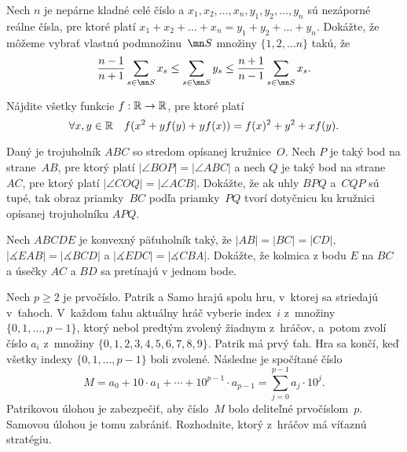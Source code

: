 {%
Nech $n$ je nepárne kladné celé číslo a $x_1, x_2, \dots, x_n, y_1, y_2, \dots, y_n$
sú nezáporné reálne čísla, pre ktoré platí
$x_1 + x_2 + \dots + x_n = y_1 + y_2 + \dots + y_n$.
Dokážte, že môžeme vybrať vlastnú podmnožinu~$\mn S$ množiny $\{1,2,\dots n\}$ takú, že
$$\frac{n-1}{n+1}\sum_{s\in\mn S}x_s \leq \sum_{s\in\mn S}y_s \leq \frac{n+1}{n-1}\sum_{s\in\mn S}x_s.$$}

{%
Nájdite všetky funkcie $f:\Bbb{R} \to \Bbb{R} $, pre ktoré platí
$$\forall x,y\in \Bbb{R}\quad f(x^2+yf(y)+yf(x))=f(x)^2+y^2+xf(y).$$}

{%
Daný je trojuholník $ABC$ so stredom opísanej kružnice~$O$.
Nech $P$ je taký bod na strane~$AB$, pre ktorý platí $|\angle BOP| = |\angle ABC|$
a nech $Q$ je taký bod na strane~$AC$, pre ktorý platí $|\angle COQ| = |\angle ACB|$.
Dokážte, že ak uhly $BPQ$ a~$CQP$ sú tupé,
tak obraz priamky~$BC$ podľa priamky~$PQ$ tvorí dotyčnicu ku kružnici
opísanej trojuholníku $APQ$.}

{%
Nech $ABCDE$ je konvexný päťuholník taký, že $|AB|=|BC|=|CD|$, $|\measuredangle EAB| = |\measuredangle BCD|$ a $|\measuredangle EDC| = |\measuredangle CBA|$. Dokážte, že kolmica z bodu $E$ na $BC$ a úsečky $AC$ a $BD$ sa pretínajú v jednom bode.}

{%
Nech $p \ge 2$ je prvočíslo. Patrik a Samo hrajú spolu hru, v~ktorej sa striedajú v~ťahoch. V~každom ťahu aktuálny hráč vyberie index~$i$ z~množiny $\{0,1,\dots,p-1\}$, ktorý nebol predtým zvolený žiadnym z~hráčov, a~potom zvolí číslo $a_i$ z~množiny $\{0,1,2,3,4,5,6,7,8,9\}$. Patrik má prvý ťah. Hra sa končí, keď všetky indexy $\{0,1,\dots,p-1\}$ boli zvolené. Následne je spočítané číslo
$$
M=a_0+10\cdot a_1+\cdots+10^{p-1}\cdot a_{p-1}=\sum^{p-1}_{j=0}a_j \cdot 10^j.
$$
Patrikovou úlohou je zabezpečiť, aby číslo~$M$ bolo deliteľné prvočíslom~$p$. Samovou úlohou je tomu zabrániť. Rozhodnite, ktorý z~hráčov má víťaznú stratégiu.}

